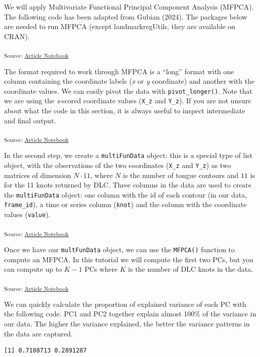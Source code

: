 \documentclass[
]{interact}
\begin{document}
We will apply Multivariate Functional Principal Component Analysis
(MFPCA). The following code has been adapted from Gubian (2024). The
packages below are needed to run MFPCA (except landmarkregUtils, they
are available on CRAN).

\textsubscript{Source:
\href{https://stefanocoretta.github.io/mv_uti/index.qmd.html}{Article
Notebook}}

The format required to work through MFPCA is a ``long'' format with one
column containing the coordinate labels (\emph{x} or \emph{y}
coordinate) and another with the coordinate values. We can easily pivot
the data with \texttt{pivot\_longer()}. Note that we are using the
\emph{z}-scored coordinate values (\texttt{X\_z} and \texttt{Y\_z}). If
you are not unsure about what the code in this section, it is always
useful to inspect intermediate and final output.

\textsubscript{Source:
\href{https://stefanocoretta.github.io/mv_uti/index.qmd.html}{Article
Notebook}}

In the second step, we create a \texttt{multiFunData} object: this is a
special type of list object, with the observations of the two
coordinates (\texttt{X\_z} and \texttt{Y\_z}) as two matrices of
dimension \(N \cdot 11\), where \(N\) is the number of tongue contours
and \(11\) is for the 11 knots returned by DLC. Three columns in the
data are used to create the \texttt{multiFunData} object: one column
with the id of each contour (in our data, \texttt{frame\_id}), a time or
series column (\texttt{knot}) and the column with the coordinate values
(\texttt{value}).

\textsubscript{Source:
\href{https://stefanocoretta.github.io/mv_uti/index.qmd.html}{Article
Notebook}}

Once we have our \texttt{multFunData} object, we can use the
\texttt{MFPCA()} function to compute an MFPCA. In this tutorial we will
compute the first two PCs, but you can compute up to \(K-1\) PCs where
\(K\) is the number of DLC knots in the data.

\textsubscript{Source:
\href{https://stefanocoretta.github.io/mv_uti/index.qmd.html}{Article
Notebook}}

We can quickly calculate the proportion of explained variance of each PC
with the following code. PC1 and PC2 together explain almost 100\% of
the variance in our data. The higher the variance explained, the better
the variance patterns in the data are captured.

\begin{verbatim}
[1] 0.7108713 0.2891287
\end{verbatim}
\end{document}
